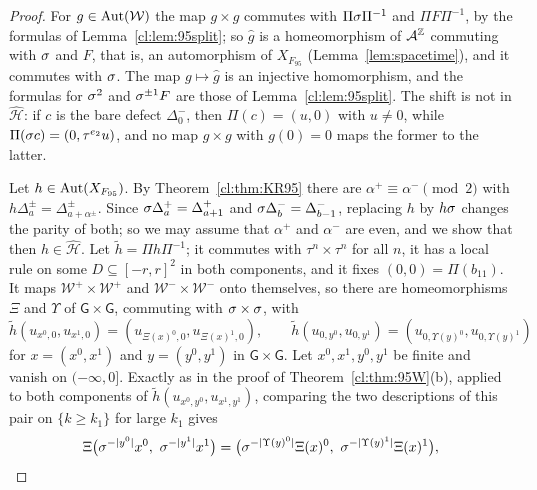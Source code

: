 \begin{proof}
For $g\in\operatorname{Aut}(\mathcal W)$ the map $g\times g$ commutes with $\Pi\sigma\Pi^{-1}$ and $\Pi F\Pi^{-1}$, by the formulas of Lemma~\ref{cl:lem:95split}; so $\hat g$ is a homeomorphism of $\mathcal{A}^{\mathbb{Z}}$ commuting with $\sigma$ and $F$, that is, an automorphism of $X_{F_{95}}$ (Lemma~\ref{lem:spacetime}), and it commutes with $\sigma$. The map $g\mapsto\hat g$ is an injective homomorphism, and the formulas for $\sigma^2$ and $\sigma^{\pm1}F$ are those of Lemma~\ref{cl:lem:95split}. The shift is not in $\hat{\mathcal H}$: if $c$ is the bare defect $\Delta^-_0$, then $\Pi(c)=(u,0)$ with $u\ne0$, while $\Pi(\sigma c)=(0,\tau^{e_2}u)$, and no map $g\times g$ with $g(0)=0$ maps the former to the latter.

Let $h\in\operatorname{Aut}(X_{F_{95}})$. By Theorem~\ref{cl:thm:KR95} there are $\alpha^+\equiv\alpha^-\pmod2$ with $h\Delta^\pm_a=\Delta^\pm_{a+\alpha^\pm}$. Since $\sigma\Delta^+_a=\Delta^+_{a+1}$ and $\sigma\Delta^-_b=\Delta^-_{b-1}$, replacing $h$ by $h\sigma$ changes the parity of both; so we may assume that $\alpha^+$ and $\alpha^-$ are even, and we show that then $h\in\hat{\mathcal H}$. Let $\tilde h=\Pi h\Pi^{-1}$; it commutes with $\tau^n\times\tau^n$ for all $n$, it has a local rule on some $D\subseteq[-r,r]^2$ in both components, and it fixes $(0,0)=\Pi(b_{11})$. It maps $\mathcal W^+\times\mathcal W^+$ and $\mathcal W^-\times\mathcal W^-$ onto themselves, so there are homeomorphisms $\Xi$ and $\Upsilon$ of $\mathsf G\times \mathsf G$, commuting with $\sigma\times\sigma$, with
\[
\tilde h(u_{x^0,0},u_{x^1,0})=(u_{\Xi(x)^0,0},u_{\Xi(x)^1,0}),\qquad\tilde h(u_{0,y^0},u_{0,y^1})=(u_{0,\Upsilon(y)^0},u_{0,\Upsilon(y)^1})
\]
for $x=(x^0,x^1)$ and $y=(y^0,y^1)$ in $\mathsf G\times \mathsf G$. Let $x^0,x^1,y^0,y^1$ be finite and vanish on $(-\infty,0]$. Exactly as in the proof of Theorem~\ref{cl:thm:95W}(b), applied to both components of $\tilde h(u_{x^0,y^0},u_{x^1,y^1})$, comparing the two descriptions of this pair on $\{k\ge k_1\}$ for large $k_1$ gives
\begin{equation}\label{cl:eq:XiUps}
\Xi\bigl(\sh^{-|y^0|}x^0,\ \sh^{-|y^1|}x^1\bigr)=\bigl(\sh^{-|\Upsilon(y)^0|}\Xi(x)^0,\ \sh^{-|\Upsilon(y)^1|}\Xi(x)^1\bigr),
\end{equation}

\end{proof}
